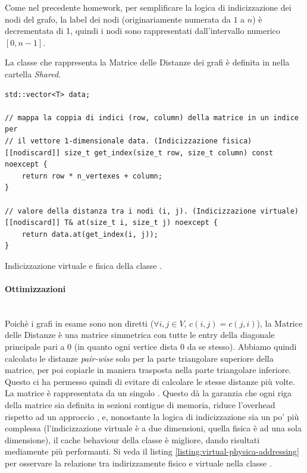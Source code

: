 \noindent Come nel precedente homework, per semplificare la logica di indicizzazione dei nodi del grafo, la label dei nodi (originariamente numerata da $1$ a $n$) è decrementata di 1, quindi i nodi sono rappresentati dall'intervallo numerico $[0, n-1]$.

\noindent La classe che rappresenta la Matrice delle Distanze dei grafi è definita in  nella cartella \textit{Shared}.

\begin{listing}[!ht]
\begin{verbatim}
std::vector<T> data;

// mappa la coppia di indici (row, column) della matrice in un indice per
// il vettore 1-dimensionale data. (Indicizzazione fisica)
[[nodiscard]] size_t get_index(size_t row, size_t column) const noexcept {
    return row * n_vertexes + column;
}

// valore della distanza tra i nodi (i, j). (Indicizzazione virtuale)
[[nodiscard]] T& at(size_t i, size_t j) noexcept {
    return data.at(get_index(i, j));
}
\end{verbatim}
\caption{Indicizzazione virtuale e fisica della classe .}
\label{listing:virtual-physica-addressing}
\end{listing}

\paragraph{Ottimizzazioni}\mbox{} \\

\noindent Poichè i grafi in esame sono non diretti ($\forall i,j \in V$, $c(i,j) = c(j,i)$), la Matrice delle Distanze è una matrice simmetrica con tutte le entry della diagonale principale pari a 0 (in quanto ogni vertice dista 0 da se stesso).
Abbiamo quindi calcolato le distanze \textit{pair-wise} solo per la parte triangolare superiore della matrice, per poi copiarle in maniera trasposta nella parte triangolare inferiore. Questo ci ha permesso quindi di evitare di calcolare le stesse distanze più volte. \\

\noindent La matrice è rappresentata da un singolo . Questo dà la garanzia che ogni riga della matrice sia definita in sezioni contigue di memoria, riduce l'overhead rispetto ad un approccio , e, nonostante la logica di indicizzazione sia un po' più complessa (l'indicizzazione virtuale è a due dimensioni, quella fisica è ad una sola dimensione), il cache behaviour della classe è migliore, dando risultati mediamente più performanti. Si veda il listing \ref{listing:virtual-physica-addressing} per osservare la relazione tra indirizzamente fisico e virtuale nella classe .

